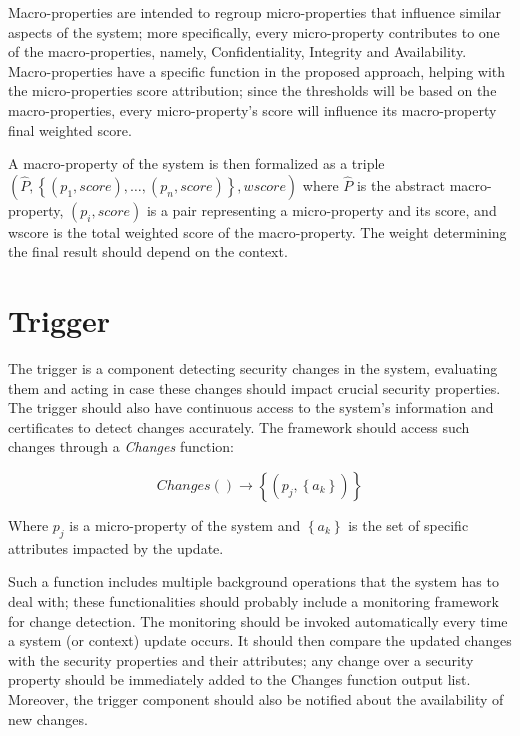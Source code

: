 Macro-properties are intended to regroup micro-properties that influence similar aspects of the system; more specifically, every micro-property contributes to one of the macro-properties, namely, Confidentiality, Integrity and Availability. Macro-properties have a specific function in the proposed approach, helping with the micro-properties score attribution; since the thresholds will be based on the macro-properties, every micro-property's score will influence its macro-property final weighted score.

A macro-property of the system is then formalized as a triple \\ \( \left ( \hat{P}, \left \{(p_1, score), \dots , (p_n, score )\right \}, wscore \right ) \)
where \(\hat{P}\) is the abstract macro-property, \( \left (p_i, score \right ) \) is a pair representing a micro-property and its score, and wscore is the total weighted score of the macro-property. The weight determining the final result should depend on the context. 




\section{Trigger}
\label{trigger}
The trigger is a component detecting security changes in the system, evaluating them and acting in case these changes should impact crucial security properties. The trigger should also have continuous access to the system's information and certificates to detect changes accurately. The framework should access such changes through a \textit{Changes} function: 

\[Changes() \rightarrow \left \{ \left ( p_j, \left \{ a_k \right \} \right ) \right \} \]

Where \(p_j\) is a micro-property of the system and \( \left \{a_k \right \} \) is the set of specific attributes impacted by the update.

Such a function includes multiple background operations that the system has to deal with; these functionalities should probably include a monitoring framework for change detection. The monitoring should be invoked automatically every time a system (or context) update occurs. It should then compare the updated changes with the security properties and their attributes; any change over a security property should be immediately added to the Changes function output list. Moreover, the trigger component should also be notified about the availability of new changes.


